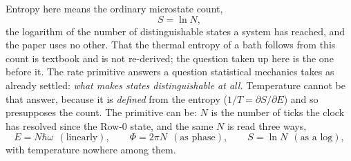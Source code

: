 \documentclass[11pt]{article}
\begin{document}
Entropy here means the ordinary microstate count,
\[ S=\ln N , \]
the logarithm of the number of distinguishable states a system has reached, and the paper uses no other. That
the thermal entropy of a bath follows from this count is textbook and is not re-derived; the question taken up
here is the one before it. The rate primitive answers a question statistical mechanics takes as already settled: \emph{what makes states distinguishable at all.} Temperature cannot be that
answer, because it is \emph{defined} from the entropy ($1/T=\partial S/\partial E$) and so presupposes the
count. The primitive can be: $N$ is the number of ticks the clock has resolved since the Row-0 state, and the
same $N$ is read three ways,
\[
E=N\hbar\omega\ \ (\text{linearly}),\qquad \Phi=2\pi N\ \ (\text{as phase}),\qquad S=\ln N\ \ (\text{as a log}),
\]
with temperature nowhere among them.
\end{document}
